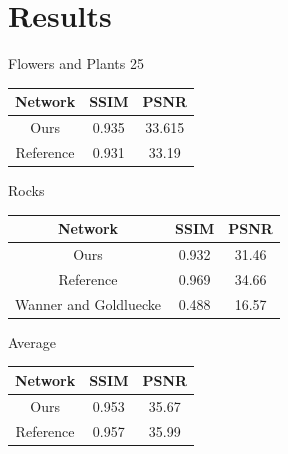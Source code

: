 \documentclass[10pt,twocolumn,letterpaper]{article}
\begin{document}
\section{Results}

\begin{center}
Flowers and Plants 25

\begin{tabular}{|c c c|}
    \hline
    Network & SSIM & PSNR \\ \hline
    Ours & 0.935 & 33.615 \\
    Reference & 0.931 & 33.19 \\ 
    \hline
\end{tabular}
\end{center}
            
\begin{center}
Rocks

\begin{tabular}{|c c c|}
    \hline
    Network & SSIM & PSNR \\ \hline
    Ours & 0.932 & 31.46 \\
    Reference & 0.969 & 34.66 \\ 
    Wanner and Goldluecke & 0.488 & 16.57 \\
    \hline
\end{tabular}
\end{center}

\begin{center}
Average

\begin{tabular}{|c c c|}
    \hline
    Network & SSIM & PSNR \\ \hline
    Ours & 0.953 & 35.67 \\
    Reference & 0.957 & 35.99 \\ 
    \hline
\end{tabular}
\end{center}
\end{document}
